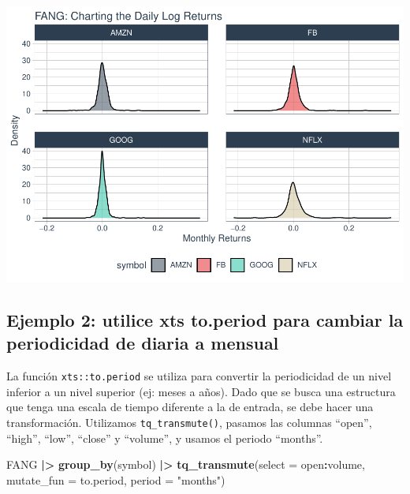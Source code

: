 \documentclass[
]{book}
\newenvironment{Shaded}{\begin{snugshade}}{\end{snugshade}}
\newcommand{\AttributeTok}[1]{\textcolor[rgb]{0.13,0.29,0.53}{#1}}
\newcommand{\FunctionTok}[1]{\textcolor[rgb]{0.13,0.29,0.53}{\textbf{#1}}}
\newcommand{\NormalTok}[1]{#1}
\newcommand{\SpecialCharTok}[1]{\textcolor[rgb]{0.81,0.36,0.00}{\textbf{#1}}}
\newcommand{\StringTok}[1]{\textcolor[rgb]{0.31,0.60,0.02}{#1}}
\begin{document}
\begin{center}\includegraphics{Libro_TidyQualityTools_files/figure-latex/unnamed-chunk-60-1} \end{center}

\hypertarget{ejemplo-2-utilice-xts-to.period-para-cambiar-la-periodicidad-de-diaria-a-mensual}{%
\subsection{Ejemplo 2: utilice xts to.period para cambiar la periodicidad de diaria a mensual}\label{ejemplo-2-utilice-xts-to.period-para-cambiar-la-periodicidad-de-diaria-a-mensual}}

La función \texttt{xts::to.period} se utiliza para convertir la periodicidad de un nivel inferior a un nivel superior (ej: meses a años). Dado que se busca una estructura que tenga una escala de tiempo diferente a la de entrada, se debe hacer una transformación. Utilizamos \texttt{tq\_transmute()}, pasamos las columnas ``open'', ``high'', ``low'', ``close'' y ``volume'', y usamos el periodo ``months''.

\begin{Shaded}
\begin{Highlighting}[]
\NormalTok{FANG }\SpecialCharTok{|\textgreater{}}  \FunctionTok{group\_by}\NormalTok{(symbol) }\SpecialCharTok{|\textgreater{}} \FunctionTok{tq\_transmute}\NormalTok{(}\AttributeTok{select =}\NormalTok{ open}\SpecialCharTok{:}\NormalTok{volume,}
                                \AttributeTok{mutate\_fun =}\NormalTok{ to.period,}
                                \AttributeTok{period =} \StringTok{"months"}\NormalTok{)}
\end{Highlighting}
\end{Shaded}
\end{document}
